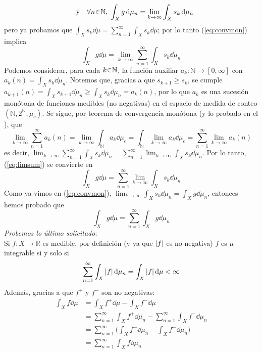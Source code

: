 \begin{sol}
\begin{equation}
\quad\text{y}\quad
\forall n\en\mathbb{N},\;
\int_X g \dd{\mu_n} 
= \lim_{k\to\infty} \int_X s_k \dd{\mu_n}
\end{equation}
pero ya probamos que $\int_X s_k \dd{\mu} = \sum^\infty_{n=1}\int_X s_k \dd{\mu}$; por lo tanto (\ref{eq:convmon}) implica
\begin{equation}\label{eq:limsum}
    \int_X g \dd{\mu} 
    = \lim_{k\to\infty}\sum^\infty_{n=1}\int_X s_k \dd{\mu_n}
\end{equation}
Podemos considerar, para cada $k\en\mathbb{N}$, la función auxiliar $a_k \colon \mathbb{N} \to [0,\infty]$ con $a_k(n) = \int_X s_k \dd{\mu_n}$. Notemos que, gracias a que $s_{k+1} \ge s_k$, se cumple $a_{k+1}(n) = \int_X s_{k+1} \dd{\mu_n} \ge \int_X s_{k} \dd{\mu_n} = a_k(n)$, por lo que $a_k$ es una sucesión monótona de funciones medibles (no negativas) en el espacio de medida de conteo $(\mathbb{N},2^{\mathbb{N}},\mu_c)$. Se sigue, por teorema de convergencia monótona (y lo probado en el ), que
\[
\lim_{k\to\infty} \sum^\infty_{n=1} a_{k}(n)
= \lim_{k\to\infty} \int_\mathbb{N} a_{k} \dd{\mu_c}
= \int_{\mathbb{N}} \lim_{k\to\infty} a_k \dd{\mu_c}
= \sum^\infty_{n=1} \lim_{k\to\infty} a_k(n)
\]
es decir, $\lim_{k\to\infty}\sum^\infty_{n=1}\int_X s_k \dd{\mu_n} = \sum^\infty_{n=1}\lim_{k\to\infty}\int_X s_k \dd{\mu_n}$. Por lo tanto, (\ref{eq:limsum}) se convierte en
\[
\int_X g \dd{\mu}
= \sum^\infty_{n=1}\lim_{k\to\infty}\int_X s_k \dd{\mu_n}
\]
Como ya vimos en (\ref{eq:convmon}), $\lim_{k\to\infty}\int_X s_k \dd{\mu_n} = \int_X g \dd{\mu_n}$, entonces hemos probado que
\[
\int_X g \dd{\mu}
= \sum^\infty_{n=1} \int_X g \dd{\mu_n}
\]
\emph{Probemos lo último solicitado}:\\
Si $f\colon X \to \mathbb{R}$ es medible, por definición (y ya que $\abs{f}$ es no negativa) $f$ es $\mu$-integrable si y solo si 
\[
\sum^\infty_{n=1} \int_X \abs{f} \dd{\mu_n}=\int_X \abs{f} \dd{\mu} < \infty
\]
Además, gracias a que $f^+$ y $f^-$ son no negativas:
\begin{align*}
\int_X f \dd{\mu} 
&= \int_X f^+ \dd{\mu} - \int_X f^- \dd{\mu}\\
&= \sum^\infty_{n=1} \int_X f^+ \dd{\mu_n} - \sum^\infty_{n=1}\int_X f^- \dd{\mu_n}\\
&= \sum^\infty_{n=1} \biggl( \int_X f^+ \dd{\mu_n} - \int_X f^- \dd{\mu_n} \biggr)\\
&= \sum^\infty_{n=1} \int_X f \dd{\mu_n}
\end{align*}
\end{sol}